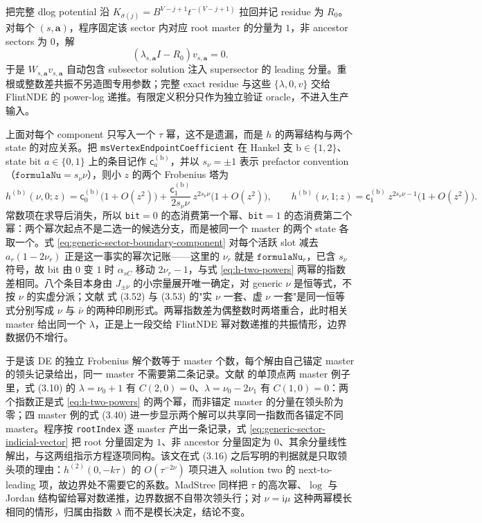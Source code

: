 \documentclass[11pt,a4paper]{ctexart}
\newcommand{\ii}{\mathrm i}
\begin{document}
把完整 dlog potential 沿 $K_{\sigma(j)}=B^{V-j+1}t^{-(V-j+1)}$ 拉回并记 residue 为 $R_0$。对每个 $(s,\bm a)$，程序固定该 sector 内对应 root master 的分量为 $1$，非 ancestor sectors 为 $0$，解
\begin{equation}
 (\lambda_{s,\bm a}I-R_0)v_{s,\bm a}=0.
 \label{eq:generic-sector-indicial-vector}
\end{equation}
于是 $W_{s,\bm a}v_{s,\bm a}$ 自动包含 subsector solution 注入 supersector 的 leading 分量。重根或整数差共振不另造图专用参数；完整 exact residue 与这些 $\{\lambda,0,v\}$ 交给 FlintNDE 的 power-log 递推。有限定义积分只作为独立验证 oracle，不进入生产输入。

上面对每个 component 只写入一个 $\tau$ 幂，这不是遗漏，而是 $h$ 的两幂结构与两个 state 的对应关系。把 \texttt{msVertexEndpointCoefficient} 在 Hankel 支 $\mathrm b\in\{1,2\}$、state bit $a\in\{0,1\}$ 上的条目记作 $\mathsf c^{(\mathrm b)}_a$，并以 $s_\nu=\pm1$ 表示 prefactor convention（$\texttt{formulaNu}=s_\nu\nu$），则小 $z$ 的两个 Frobenius 塔为
\begin{equation}
 h^{(\mathrm b)}(\nu,0;z)=\mathsf c^{(\mathrm b)}_0\bigl(1+O(z^2)\bigr)
 +\frac{\mathsf c^{(\mathrm b)}_1}{2s_\nu\nu}\,z^{2s_\nu\nu}\bigl(1+O(z^2)\bigr),
 \qquad
 h^{(\mathrm b)}(\nu,1;z)=\mathsf c^{(\mathrm b)}_1\,z^{2s_\nu\nu-1}\bigl(1+O(z^2)\bigr).
 \label{eq:h-two-powers}
\end{equation}
常数项在求导后消失，所以 \texttt{bit}$=0$ 的态消费第一个幂、\texttt{bit}$=1$ 的态消费第二个幂：两个幂次起点不是二选一的候选分支，而是被同一个 master 的两个 state 各取一个。式 \eqref{eq:generic-sector-boundary-component} 对每个活跃 slot 减去 $a_r(1-2\nu_r)$ 正是这一事实的幂次记账——这里的 $\nu_r$ 就是 $\texttt{formulaNu}_r$，已含 $s_\nu$ 符号，故 bit 由 $0$ 变 $1$ 时 $\alpha_{sC}$ 移动 $2\nu_r-1$，与式 \eqref{eq:h-two-powers} 两幂的指数差相同。八个条目本身由 $J_{\pm\nu}$ 的小宗量展开唯一确定，对 generic $\nu$ 是恒等式，不按 $\nu$ 的实虚分派；文献 \cite{Chen:2024jms} 式 (3.52) 与 (3.53) 的"实 $\nu$ 一套、虚 $\nu$ 一套"是同一恒等式分别写成 $\nu$ 与 $\bar\nu$ 的两种印刷形式。两幂指数差为偶整数时两塔重合，此时相关 master 给出同一个 $\lambda$，正是上一段交给 FlintNDE 幂对数递推的共振情形，边界数据仍不增行。

于是该 DE 的独立 Frobenius 解个数等于 master 个数，每个解由自己锚定 master 的领头记录给出，同一 master 不需要第二条记录。文献 \cite{Chen:2024jms} 的单顶点两 master 例子里，式 (3.10) 的 $\lambda=\nu_0+1$ 有 $C(2,0)=0$、$\lambda=\nu_0-2\nu_1$ 有 $C(1,0)=0$：两个指数正是式 \eqref{eq:h-two-powers} 的两个幂，而非锚定 master 的分量在领头阶为零；四 master 例的式 (3.40) 进一步显示两个解可以共享同一指数而各锚定不同 master。程序按 \texttt{rootIndex} 逐 master 产出一条记录，式 \eqref{eq:generic-sector-indicial-vector} 把 root 分量固定为 $1$、非 ancestor 分量固定为 $0$、其余分量线性解出，与这两组指示方程逐项同构。该文在式 (3.16) 之后写明的判据就是只取领头项的理由：$h^{(2)}(0,-k\tau)$ 的 $O(\tau^{-2\nu})$ 项只进入 solution two 的 next-to-leading 项，故边界处不需要它的系数。MadStree 同样把 $\tau$ 的高次幂、$\log$ 与 Jordan 结构留给幂对数递推，边界数据不自带次领头行；对 $\nu=\ii\mu$ 这种两幂模长相同的情形，归属由指数 $\lambda$ 而不是模长决定，结论不变。
\end{document}
